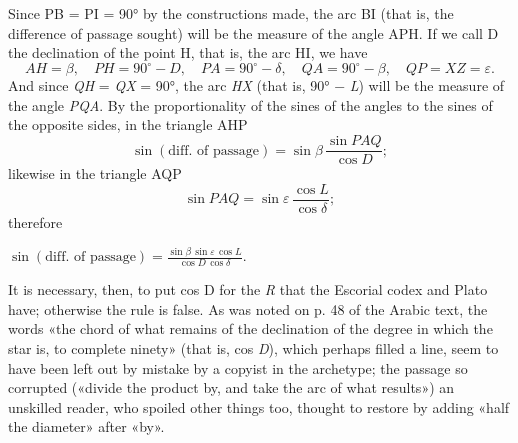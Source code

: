 \documentclass[11pt]{article}
\begin{document}
\par Since PB = PI = 90° by the constructions made, the arc BI (that is, the difference of passage sought) will be the measure of the angle APH. If we call D the declination of the point H, that is, the arc HI, we have \[ AH = \beta, \quad PH = 90^\circ - D, \quad PA = 90^\circ - \delta, \quad QA = 90^\circ - \beta, \quad QP = XZ = \varepsilon. \] And since \emph{QH} = \emph{QX} = 90°, the arc \emph{HX} (that is, 90° − \emph{L}) will be the measure of the angle \emph{PQA}. By the proportionality of the sines of the angles to the sines of the opposite sides, in the triangle AHP \[ \sin(\text{diff. of passage}) = \sin\beta\,\frac{\sin PAQ}{\cos D}; \] likewise in the triangle AQP \[ \sin PAQ = \sin\varepsilon\,\frac{\cos L}{\cos\delta}; \] therefore \par\noindent\hspace*{1.5em}$\displaystyle \sin(\text{diff. of passage}) = \frac{\sin\beta\,\sin\varepsilon\,\cos L}{\cos D\,\cos\delta}.$\par\par
\par It is necessary, then, to put cos D for the \emph{R} that the Escorial codex and Plato have; otherwise the rule is false. As was noted on p. 48 of the Arabic text, the words «the chord of what remains of the declination of the degree in which the star is, to complete ninety» (that is, cos \emph{D}), which perhaps filled a line, seem to have been left out by mistake by a copyist in the archetype; the passage so corrupted («divide the product by, and take the arc of what results») an unskilled reader, who spoiled other things too, thought to restore by adding «half the diameter» after «by».\par
\end{document}
